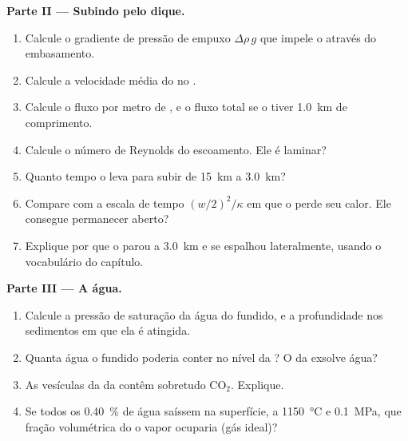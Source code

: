 \begin{problem}
\noindent\textbf{Parte II --- Subindo pelo dique.}
\begin{enumerate}[resume]
\item Calcule o gradiente de pressão de empuxo $\Delta\rho\,g$ que impele o 
através do embasamento.
\item Calcule a velocidade média do  no .
\item Calcule o fluxo por metro de , e o fluxo total se o  tiver
\qty{1.0}{km} de comprimento.
\item Calcule o número de Reynolds do escoamento. Ele é laminar?
\item Quanto tempo o  leva para subir de \qty{15}{km} a \qty{3.0}{km}?
\item Compare com a escala de tempo $(w/2)^2/\kappa$ em que o  perde seu
calor. Ele consegue permanecer aberto?
\item Explique por que o  parou a \qty{3.0}{km} e se espalhou lateralmente, usando
o vocabulário do capítulo.
\end{enumerate}

\noindent\textbf{Parte III --- A água.}
\begin{enumerate}[resume]
\item Calcule a pressão de saturação da água do fundido, e a profundidade nos
sedimentos em que ela é atingida.
\item Quanta água o fundido poderia conter no nível da ? O  da 
exsolve água?
\item As vesículas da  da  contêm sobretudo CO$_2$. Explique.
\item Se todos os \qty{0.40}{\percent} de água saíssem na superfície, a
\qty{1150}{\celsius} e \qty{0.1}{MPa}, que fração volumétrica do 
o vapor ocuparia (gás ideal)?
\end{enumerate}


\end{problem}
